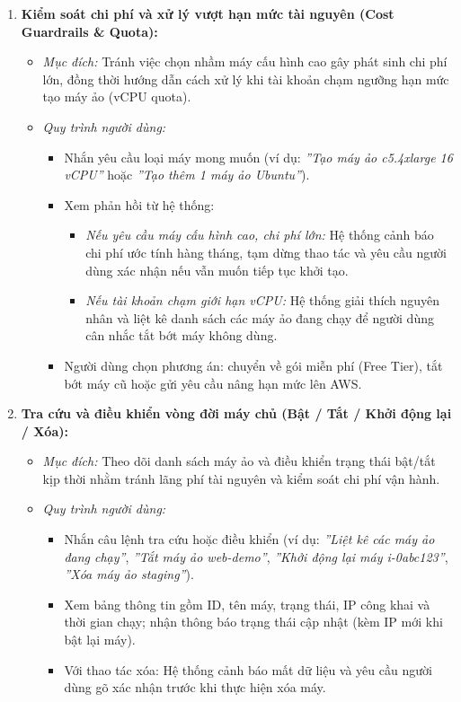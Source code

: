 \documentclass[a4paper,12pt]{article}
\begin{document}
\begin{enumerate}
  \item \textbf{Kiểm soát chi phí và xử lý vượt hạn mức tài nguyên (Cost Guardrails \& Quota):}
  \begin{itemize}
    \item \textit{Mục đích:} Tránh việc chọn nhầm máy cấu hình cao gây phát sinh chi phí lớn, đồng thời hướng dẫn cách xử lý khi tài khoản chạm ngưỡng hạn mức tạo máy ảo (vCPU quota).
    \item \textit{Quy trình người dùng:}
    \begin{itemize}
      \item Nhắn yêu cầu loại máy mong muốn (ví dụ: \textit{''Tạo máy ảo c5.4xlarge 16 vCPU''} hoặc \textit{''Tạo thêm 1 máy ảo Ubuntu''}).
      \item Xem phản hồi từ hệ thống:
      \begin{itemize}
        \item \textit{Nếu yêu cầu máy cấu hình cao, chi phí lớn:} Hệ thống cảnh báo chi phí ước tính hàng tháng, tạm dừng thao tác và yêu cầu người dùng xác nhận nếu vẫn muốn tiếp tục khởi tạo.
        \item \textit{Nếu tài khoản chạm giới hạn vCPU:} Hệ thống giải thích nguyên nhân và liệt kê danh sách các máy ảo đang chạy để người dùng cân nhắc tắt bớt máy không dùng.
      \end{itemize}
      \item Người dùng chọn phương án: chuyển về gói miễn phí (Free Tier), tắt bớt máy cũ hoặc gửi yêu cầu nâng hạn mức lên AWS.
    \end{itemize}
  \end{itemize}

  \item \textbf{Tra cứu và điều khiển vòng đời máy chủ (Bật / Tắt / Khởi động lại / Xóa):}
  \begin{itemize}
    \item \textit{Mục đích:} Theo dõi danh sách máy ảo và điều khiển trạng thái bật/tắt kịp thời nhằm tránh lãng phí tài nguyên và kiểm soát chi phí vận hành.
    \item \textit{Quy trình người dùng:}
    \begin{itemize}
      \item Nhắn câu lệnh tra cứu hoặc điều khiển (ví dụ: \textit{''Liệt kê các máy ảo đang chạy''}, \textit{''Tắt máy ảo web-demo''}, \textit{''Khởi động lại máy i-0abc123''}, \textit{''Xóa máy ảo staging''}).
      \item Xem bảng thông tin gồm ID, tên máy, trạng thái, IP công khai và thời gian chạy; nhận thông báo trạng thái cập nhật (kèm IP mới khi bật lại máy).
      \item Với thao tác xóa: Hệ thống cảnh báo mất dữ liệu và yêu cầu người dùng gõ xác nhận trước khi thực hiện xóa máy.
    \end{itemize}
  \end{itemize}


\end{enumerate}
\end{document}
